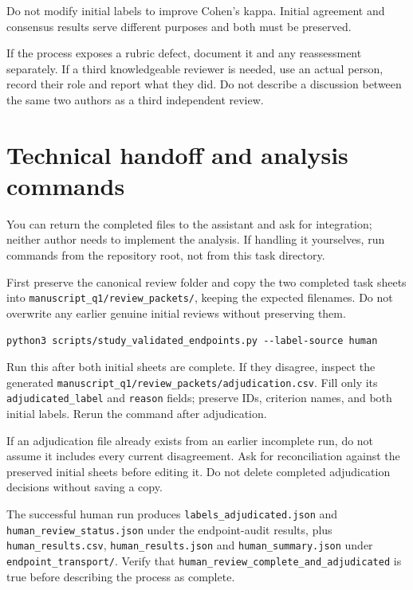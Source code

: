 \documentclass[11pt,a4paper]{article}
\begin{document}
Do not modify initial labels to improve Cohen's kappa. Initial agreement and consensus results serve different purposes and both must be preserved.


If the process exposes a rubric defect, document it and any reassessment separately. If a third knowledgeable reviewer is needed, use an actual person, record their role and report what they did. Do not describe a discussion between the same two authors as a third independent review.


\section{Technical handoff and analysis commands}


You can return the completed files to the assistant and ask for integration; neither author needs to implement the analysis. If handling it yourselves, run commands from the repository root, not from this task directory.


First preserve the canonical review folder and copy the two completed task sheets into \nolinkurl{manuscript_q1/review_packets/}, keeping the expected filenames. Do not overwrite any earlier genuine initial reviews without preserving them.


\begin{lstlisting}
python3 scripts/study_validated_endpoints.py --label-source human
\end{lstlisting}


Run this after both initial sheets are complete. If they disagree, inspect the generated \nolinkurl{manuscript_q1/review_packets/adjudication.csv}. Fill only its \nolinkurl{adjudicated_label} and \nolinkurl{reason} fields; preserve IDs, criterion names, and both initial labels. Rerun the command after adjudication.


If an adjudication file already exists from an earlier incomplete run, do not assume it includes every current disagreement. Ask for reconciliation against the preserved initial sheets before editing it. Do not delete completed adjudication decisions without saving a copy.


The successful human run produces \nolinkurl{labels_adjudicated.json} and \nolinkurl{human_review_status.json} under the endpoint-audit results, plus \nolinkurl{human_results.csv}, \nolinkurl{human_results.json} and \nolinkurl{human_summary.json} under \nolinkurl{endpoint_transport/}. Verify that \nolinkurl{human_review_complete_and_adjudicated} is true before describing the process as complete.
\end{document}
